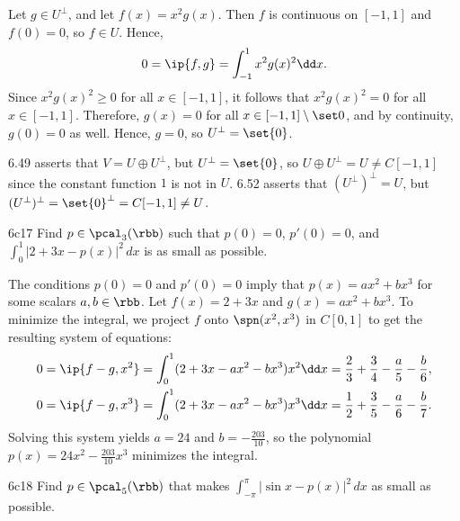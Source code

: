\begin{solenum}
    \item Let $g \in U^\perp$, and let $f(x) = x^2g(x)$.
    Then $f$ is continuous on $[-1, 1]$ and $f(0) = 0$, so $f \in U$.
    Hence,
    \[
        0 = \ip{f, g} = \int_{-1}^{1} x^2 g(x)^2 \dd x.
    \]
    Since $x^2 g(x)^2 \geq 0$ for all $x \in [-1, 1]$, it follows that $x^2 g(x)^2 = 0$ for all $x \in [-1, 1]$.
    Therefore, $g(x) = 0$ for all $x \in [-1, 1] \setminus \set 0$, and by continuity, $g(0) = 0$ as well.
    Hence, $g = 0$, so $U^\perp = \set{0}$.
    \item 6.49 asserts that $V = U \oplus U^\perp$, but $U^\perp = \set{0}$, so $U \oplus U^\perp = U \neq C[-1, 1]$ since the constant function $1$ is not in $U$.
    6.52 asserts that $(U^\perp)^\perp = U$, but $(U^\perp)^\perp = \set{0}^\perp = C[-1, 1] \neq U$.
\end{solenum}

\begin{exercise}{6c17}
    Find $p \in \pcal_3(\rbb)$ such that $p(0) = 0$, $p'(0) = 0$, and $\int_0^1 |2 + 3x - p(x)|^2\, dx$ is as small as possible.
\end{exercise}

\begin{sol}
    The conditions $p(0) = 0$ and $p'(0) = 0$ imply that $p(x) = ax^2 + bx^3$ for some scalars $a, b \in \rbb$.
    Let $f(x) = 2 + 3x$ and $g(x) = ax^2 + bx^3$.
    To minimize the integral, we project $f$ onto $\spn(x^2, x^3)$ in $C[0, 1]$ to get the resulting system of equations:
    \begin{align*}
        0 &= \ip{f - g, x^2} = \int_0^1 (2 + 3x - ax^2 - bx^3)x^2 \dd x = \frac{2}{3} + \frac{3}{4} - \frac{a}{5} - \frac{b}{6}, \\
        0 &= \ip{f - g, x^3} = \int_0^1 (2 + 3x - ax^2 - bx^3)x^3 \dd x = \frac{1}{2} + \frac{3}{5} - \frac{a}{6} - \frac{b}{7}.
    \end{align*}
    Solving this system yields $a = 24$ and $b = -\frac{203}{10}$, so the polynomial $p(x) = 24x^2 - \frac{203}{10}x^3$ minimizes the integral.
\end{sol}

\begin{exercise}{6c18}
    Find $p \in \pcal_5(\rbb)$ that makes $\int_{-\pi}^{\pi} |\sin x - p(x)|^2\, dx$ as small as possible.

\end{exercise}

